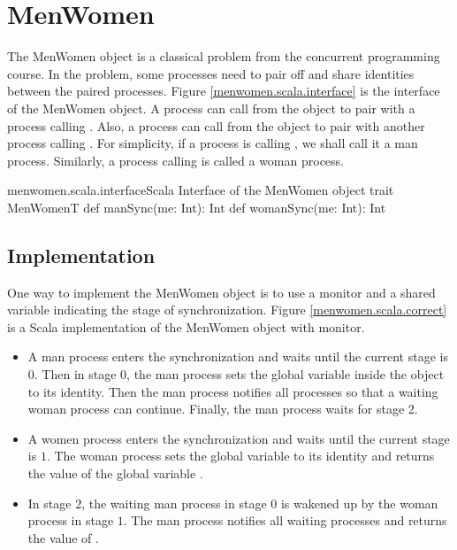 \documentclass[a4paper, 12pt]{article}
\begin{document}
\newpage
\section{MenWomen}
The MenWomen object is a classical problem from the concurrent programming course. In the problem, some processes need to pair off and share identities between the paired processes. Figure \ref{menwomen.scala.interface} is the interface of the MenWomen object. A process can call  from the object to pair with a process calling . Also, a process can call  from the object to pair with another process calling . For simplicity, if a process is calling , we shall call it a man process. Similarly, a process calling  is called a woman process.

\begin{scalafloat}{menwomen.scala.interface}{Scala Interface of the MenWomen object}
trait MenWomenT{
  def manSync(me: Int): Int
  def womanSync(me: Int): Int
}
\end{scalafloat}

\subsection{Implementation}
One way to implement the MenWomen object is to use a monitor and a shared variable indicating the stage of synchronization. Figure \ref{menwomen.scala.correct} is a Scala implementation of the MenWomen object with monitor.
\begin{itemize}
  \item A man process enters the synchronization and waits until the current stage is $0$. Then in stage $0$, the man process sets the global variable  inside the  object to its identity. Then the man process notifies all processes so that a waiting woman process can continue. Finally, the man process waits for stage 2.
  \item A women process enters the synchronization and waits until the current stage is $1$. The woman process sets the global variable  to its identity and returns the value of the global variable .
  \item In stage $2$, the waiting man process in stage $0$ is wakened up by the woman process in stage $1$. The man process notifies all waiting processes and returns the value of .
\end{itemize}
\end{document}
